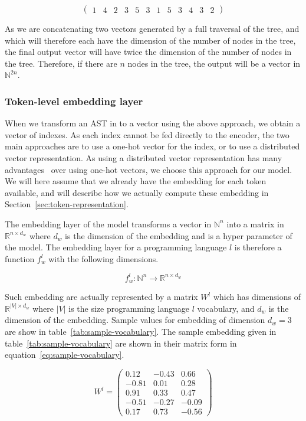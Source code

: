 \[ \begin{pmatrix}1 & 4 & 2 & 3 & 5 & 3 & 1 & 5 & 3 & 4 & 3 & 2\end{pmatrix} \]

As we are concatenating two vectors generated by a full traversal of the tree,
and which will therefore each have the dimension of the number of nodes in the
tree, the final output vector will have twice the dimension of the number of
nodes in the tree. Therefore, if there are $n$ nodes in the tree, the output
will be a vector in $\mathbb{N}^{2n}$.
%
\subsubsection{\label{sssec:token-embedding-layer} Token-level embedding layer}
When we transform an AST in to a vector using the above approach, we obtain a
vector of indexes. As each index cannot be fed directly to the encoder, the two
main approaches are to use a one-hot vector for the index, or to use a
distributed vector representation. As using a distributed vector representation
has many advantages~\cite{DBLP:journals/corr/MikolovSCCD13} over using one-hot
vectors, we choose this approach for our model. We will here assume that we
already have the embedding for each token available, and will describe how we
actually compute these embedding in Section~\ref{sec:token-representation}.

The embedding layer of the model transforms a vector in $\mathbb{N}^n$ into a
matrix in $\mathbb{R}^{n\times d_w}$ where $d_w$ is the dimension of the embedding
and is a hyper parameter of the model. The embedding layer for a programming
language $l$ is therefore a function $f_w^l$ with the following dimensions.

\begin{equation}
  f_w^l : \mathbb{N}^n \rightarrow \mathbb{R}^{n\times d_w}
\end{equation}

Such embedding are actually represented by a matrix $W^l$ which has dimensions
of $\mathbb{R}^{|V|\times d_w}$ where $|V|$ is the size programming language $l$
vocabulary, and $d_w$ is the dimension of the embedding.
Sample values for embedding of dimension $d_w = 3$ are show in
table~\ref{tab:sample-vocabulary}.
The sample embedding given in table~\ref{tab:sample-vocabulary} are
shown in their matrix form in equation~\ref{eq:sample-vocabulary}.

\begin{equation}
  \label{eq:sample-vocabulary}
  W^l =
  \begin{pmatrix}
    0.12 & -0.43 & 0.66\\
    -0.81 & 0.01 & 0.28\\
    0.91 & 0.33 & 0.47\\
    -0.51 & -0.27 & -0.09\\
    0.17 & 0.73 & -0.56
  \end{pmatrix}
\end{equation}

